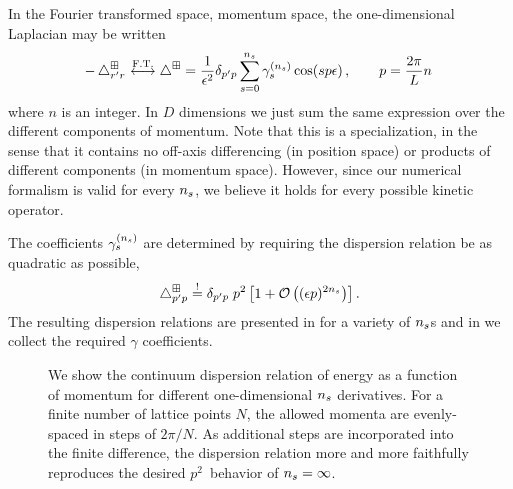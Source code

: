 In the Fourier transformed space, momentum space, the one-dimensional Laplacian may be written
\begin{equation}
    \label{eq:laplacian}
    -\mathop{}\!\mathbin\bigtriangleup_{r'r^{}}^\boxplus
    \overset{\text{F.T.}}{\longleftrightarrow}
    \mathop{}\!\mathbin\bigtriangleup^\boxplus
    =
    \frac{1}{\epsilon^2}
    \delta_{p'p}
    \sum_{s=0}^{{n_s}} \gamma_s^{({n_s})} \cos(s p \epsilon)
    \, , \qquad p = \frac{2 \pi}{L} n \, 
\end{equation}
where $n$ is an integer.
In $D$ dimensions we just sum the same expression over the different components of momentum.
Note that this is a specialization, in the sense that it contains no off-axis differencing (in position space) or products of different components (in momentum space).
However, since our numerical formalism is valid for every ${n_s}$, we believe it holds for every possible kinetic operator.

The coefficients $\gamma_{s}^{({n_s})}$ are determined by requiring the dispersion relation be as quadratic as possible,
\begin{equation}
    \label{eq:gamma determination}
    \mathop{}\!\mathbin\bigtriangleup^\boxplus_{p'p}
    \overset{!}{=}
    \delta_{p'p} \;
    p^2 \left[
        1 + \mathcal{O}\left((\epsilon p)^{2{n_s}}\right)
    \right].
\end{equation}
The resulting dispersion relations are presented in  for a variety of ${n_s}$s and in  we collect the required $\gamma$ coefficients.

\begin{figure}
    
    \caption{We show the continuum dispersion relation of energy as a function of momentum for different one-dimensional ${n_s}$ derivatives.  For a finite number of lattice points $N$, the allowed momenta are evenly-spaced in steps of $2\pi/N$.
    As additional steps are incorporated into the finite difference, the dispersion relation more and more faithfully reproduces the desired $p^2$~behavior of ${n_s}=\infty$.
    }
    \label{fig:dispersion relation}
\end{figure}


